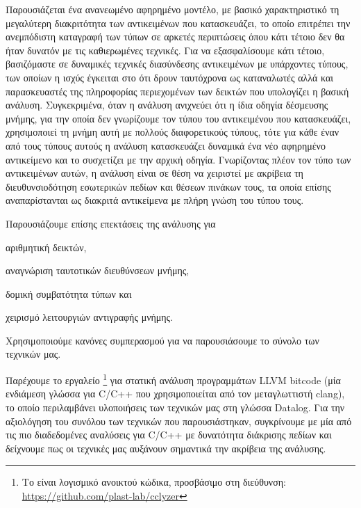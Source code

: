 Παρουσιάζεται ένα ανανεωμένο αφηρημένο μοντέλο, με βασικό
χαρακτηριστικό τη μεγαλύτερη διακριτότητα των αντικειμένων που
κατασκευάζει, το οποίο επιτρέπει την ανεμπόδιστη καταγραφή των τύπων
σε αρκετές περιπτώσεις όπου κάτι τέτοιο δεν θα ήταν δυνατόν με τις
καθιερωμένες τεχνικές.  Για να εξασφαλίσουμε κάτι τέτοιο, βασιζόμαστε
σε δυναμικές τεχνικές διασύνδεσης αντικειμένων με υπάρχοντες τύπους,
των οποίων η ισχύς έγκειται στο ότι δρουν ταυτόχρονα ως καταναλωτές
αλλά και παρασκευαστές της πληροφορίας περιεχομένων των δεικτών που
υπολογίζει η βασική ανάλυση. Συγκεκριμένα, όταν η ανάλυση ανιχνεύει
ότι η ίδια οδηγία δέσμευσης μνήμης, για την οποία δεν γνωρίζουμε τον
τύπου του αντικειμένου που κατασκευάζει, χρησιμοποιεί τη μνήμη αυτή με
πολλούς διαφορετικούς τύπους, τότε για κάθε έναν από τους τύπους
αυτούς η ανάλυση κατασκευάζει δυναμικά ένα νέο αφηρημένο αντικείμενο
και το συσχετίζει με την αρχική οδηγία. Γνωρίζοντας πλέον τον τύπο των
αντικειμένων αυτών, η ανάλυση είναι σε θέση να χειριστεί με ακρίβεια
τη διευθυνσιοδότηση εσωτερικών πεδίων και θέσεων πινάκων τους, τα
οποία επίσης αναπαρίστανται ως διακριτά αντικείμενα με πλήρη γνώση του
τύπου τους.

Παρουσιάζουμε επίσης επεκτάσεις της ανάλυσης για
\begin{inparaenum}[(1)]
\item αριθμητική δεικτών,
\item αναγνώριση ταυτοτικών διευθύνσεων μνήμης,
\item δομική συμβατότητα τύπων και
\item χειρισμό λειτουργιών αντιγραφής μνήμης.
\end{inparaenum}
Χρησιμοποιούμε κανόνες συμπερασμού για να παρουσιάσουμε το σύνολο των
τεχνικών μας.

Παρέχουμε το εργαλείο {\en \cclyzer{}}\footnote{Το {\en \cclyzer{}}
  είναι λογισμικό ανοικτού κώδικα, προσβάσιμο στη διεύθυνση: {\en
    \url{https://github.com/plast-lab/cclyzer}}} για στατική ανάλυση
προγραμμάτων {\en LLVM bitcode} (μία ενδιάμεση γλώσσα για {\en C/C++}
που χρησιμοποιείται από τον μεταγλωττιστή {\en clang}), το οποίο
περιλαμβάνει υλοποιήσεις των τεχνικών μας στη γλώσσα {\en Datalog}.
%
Για την αξιολόγηση του συνόλου των τεχνικών που παρουσιάστηκαν,
συγκρίνουμε με μία από τις πιο διαδεδομένες αναλύσεις για {\en C/C++}
με δυνατότητα διάκρισης πεδίων
\cite{paste/PearceKH04,toplas/PearceKH07} και δείχνουμε πως οι
τεχνικές μας αυξάνουν σημαντικά την ακρίβεια της ανάλυσης.



